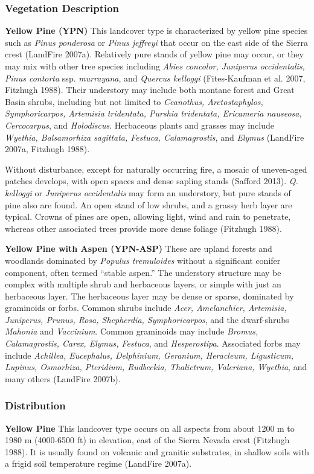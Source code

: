 \subsubsection{Vegetation Description}
\textbf{Yellow Pine (YPN)}	This landcover type is characterized by yellow pine species such as \emph{Pinus ponderosa} or \emph{Pinus jeffreyi} that occur on the east side of the Sierra crest (LandFire 2007a). Relatively pure stands of yellow pine may occur, or they may mix with other tree species including \emph{Abies concolor, Juniperus occidentalis, Pinus contorta} ssp. \emph{murrayana}, and \emph{Quercus kelloggi} (Fites-Kaufman et al. 2007, Fitzhugh 1988). Their understory may include both montane forest and Great Basin shrubs, including but not limited to \emph{Ceanothus, Arctostaphylos, Symphoricarpos, Artemisia tridentata, Purshia tridentata, Ericameria nauseosa, Cercocarpus}, and \emph{Holodiscus}. Herbaceous plants and grasses may include \emph{Wyethia, Balsamorhiza sagittata, Festuca, Calamagrostis}, and \emph{Elymus} (LandFire 2007a, Fitzhugh 1988).

Without disturbance, except for naturally occurring fire, a mosaic of uneven-aged patches develops, with open spaces and dense sapling stands (Safford 2013). \emph{Q. kelloggi} or \emph{Juniperus occidentalis} may form an understory, but pure stands of pine also are found. An open stand of low shrubs, and a grassy herb layer are typical. Crowns of pines are open, allowing light, wind and rain to penetrate, whereas other associated trees provide more dense foliage (Fitzhugh 1988).

\textbf{Yellow Pine with Aspen (YPN-ASP)} These are upland forests and woodlands dominated by \emph{Populus tremuloides} without a significant conifer component, often termed ``stable aspen.'' The understory structure may be complex with multiple shrub and herbaceous layers, or simple with just an herbaceous layer. The herbaceous layer may be dense or sparse, dominated by graminoids or forbs. Common shrubs include \emph{Acer, Amelanchier, Artemisia, Juniperus, Prunus, Rosa, Shepherdia, Symphoricarpos}, and the dwarf-shrubs \emph{Mahonia} and \emph{Vaccinium}. Common graminoids may include \emph{Bromus, Calamagrostis, Carex, Elymus, Festuca}, and \emph{Hesperostipa}. Associated forbs may include \emph{Achillea, Eucephalus, Delphinium, Geranium, Heracleum, Ligusticum, Lupinus, Osmorhiza, Pteridium, Rudbeckia, Thalictrum, Valeriana, Wyethia}, and many others (LandFire 2007b).


\subsubsection{Distribution}
\textbf{Yellow Pine}	This landcover type occurs on all aspects from about 1200 m to 1980 m (4000-6500 ft) in elevation, east of the Sierra Nevada crest (Fitzhugh 1988). It is usually found on volcanic and granitic substrates, in shallow soils with a frigid soil temperature regime (LandFire 2007a).

